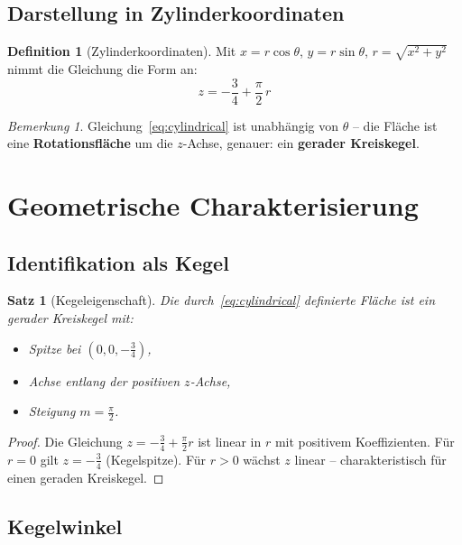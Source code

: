 \documentclass[12pt,a4paper]{article}
\theoremstyle{plain}
\newtheorem{satz}{Satz}[section]
\theoremstyle{definition}
\newtheorem{definition}{Definition}[section]
\theoremstyle{remark}
\newtheorem{bemerkung}{Bemerkung}[section]
\begin{document}
\subsection{Darstellung in Zylinderkoordinaten}

\begin{definition}[Zylinderkoordinaten]\label{def:zylinder}
Mit $x = r\cos\theta$, $y = r\sin\theta$, $r = \sqrt{x^2+y^2}$ nimmt
die Gleichung die Form an:
\begin{equation}\label{eq:cylindrical}
\boxed{z = -\frac{3}{4} + \frac{\pi}{2}\,r}
\end{equation}
\end{definition}

\begin{bemerkung}
Gleichung~\eqref{eq:cylindrical} ist unabh\"{a}ngig von $\theta$ -- die Fl\"{a}che ist
eine \textbf{Rotationsfl\"{a}che} um die $z$-Achse, genauer: ein \textbf{gerader Kreiskegel}.
\end{bemerkung}

\section{Geometrische Charakterisierung}

\subsection{Identifikation als Kegel}

\begin{satz}[Kegeleigenschaft]\label{satz:kegel}
Die durch~\eqref{eq:cylindrical} definierte Fl\"{a}che ist ein gerader Kreiskegel mit:
\begin{itemize}
\item Spitze bei $(0,0,-\tfrac{3}{4})$,
\item Achse entlang der positiven $z$-Achse,
\item Steigung $m = \tfrac{\pi}{2}$.
\end{itemize}
\end{satz}

\begin{proof}
Die Gleichung $z = -\tfrac{3}{4}+\tfrac{\pi}{2}r$ ist linear in $r$ mit positivem Koeffizienten.
F\"{u}r $r=0$ gilt $z=-\tfrac{3}{4}$ (Kegelspitze). F\"{u}r $r>0$ w\"{a}chst $z$ linear
-- charakteristisch f\"{u}r einen geraden Kreiskegel.
\end{proof}

\subsection{Kegelwinkel}\label{sec:kegelwinkel}
\end{document}
